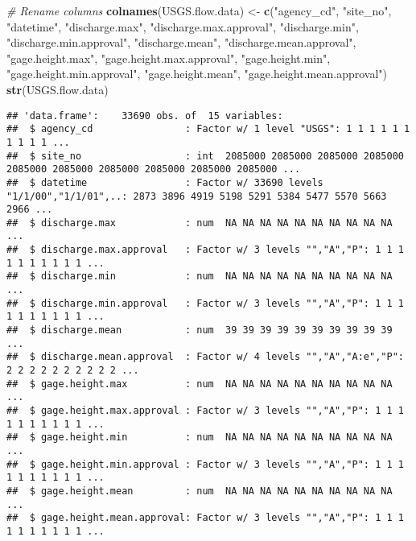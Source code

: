 \documentclass[]{article}
\newenvironment{Shaded}{\begin{snugshade}}{\end{snugshade}}
\newcommand{\CommentTok}[1]{\textcolor[rgb]{0.56,0.35,0.01}{\textit{#1}}}
\newcommand{\KeywordTok}[1]{\textcolor[rgb]{0.13,0.29,0.53}{\textbf{#1}}}
\newcommand{\NormalTok}[1]{#1}
\newcommand{\StringTok}[1]{\textcolor[rgb]{0.31,0.60,0.02}{#1}}
\begin{document}
\begin{Shaded}
\begin{Highlighting}[]
\CommentTok{# Rename columns}
\KeywordTok{colnames}\NormalTok{(USGS.flow.data) <-}\StringTok{ }\KeywordTok{c}\NormalTok{(}\StringTok{"agency_cd"}\NormalTok{, }\StringTok{"site_no"}\NormalTok{, }\StringTok{"datetime"}\NormalTok{, }
                              \StringTok{"discharge.max"}\NormalTok{, }\StringTok{"discharge.max.approval"}\NormalTok{, }
                              \StringTok{"discharge.min"}\NormalTok{, }\StringTok{"discharge.min.approval"}\NormalTok{, }
                              \StringTok{"discharge.mean"}\NormalTok{, }\StringTok{"discharge.mean.approval"}\NormalTok{, }
                              \StringTok{"gage.height.max"}\NormalTok{, }\StringTok{"gage.height.max.approval"}\NormalTok{, }
                              \StringTok{"gage.height.min"}\NormalTok{, }\StringTok{"gage.height.min.approval"}\NormalTok{, }
                              \StringTok{"gage.height.mean"}\NormalTok{, }\StringTok{"gage.height.mean.approval"}\NormalTok{)}
\KeywordTok{str}\NormalTok{(USGS.flow.data)}
\end{Highlighting}
\end{Shaded}

\begin{verbatim}
## 'data.frame':    33690 obs. of  15 variables:
##  $ agency_cd                : Factor w/ 1 level "USGS": 1 1 1 1 1 1 1 1 1 1 ...
##  $ site_no                  : int  2085000 2085000 2085000 2085000 2085000 2085000 2085000 2085000 2085000 2085000 ...
##  $ datetime                 : Factor w/ 33690 levels "1/1/00","1/1/01",..: 2873 3896 4919 5198 5291 5384 5477 5570 5663 2966 ...
##  $ discharge.max            : num  NA NA NA NA NA NA NA NA NA NA ...
##  $ discharge.max.approval   : Factor w/ 3 levels "","A","P": 1 1 1 1 1 1 1 1 1 1 ...
##  $ discharge.min            : num  NA NA NA NA NA NA NA NA NA NA ...
##  $ discharge.min.approval   : Factor w/ 3 levels "","A","P": 1 1 1 1 1 1 1 1 1 1 ...
##  $ discharge.mean           : num  39 39 39 39 39 39 39 39 39 39 ...
##  $ discharge.mean.approval  : Factor w/ 4 levels "","A","A:e","P": 2 2 2 2 2 2 2 2 2 2 ...
##  $ gage.height.max          : num  NA NA NA NA NA NA NA NA NA NA ...
##  $ gage.height.max.approval : Factor w/ 3 levels "","A","P": 1 1 1 1 1 1 1 1 1 1 ...
##  $ gage.height.min          : num  NA NA NA NA NA NA NA NA NA NA ...
##  $ gage.height.min.approval : Factor w/ 3 levels "","A","P": 1 1 1 1 1 1 1 1 1 1 ...
##  $ gage.height.mean         : num  NA NA NA NA NA NA NA NA NA NA ...
##  $ gage.height.mean.approval: Factor w/ 3 levels "","A","P": 1 1 1 1 1 1 1 1 1 1 ...
\end{verbatim}
\end{document}
